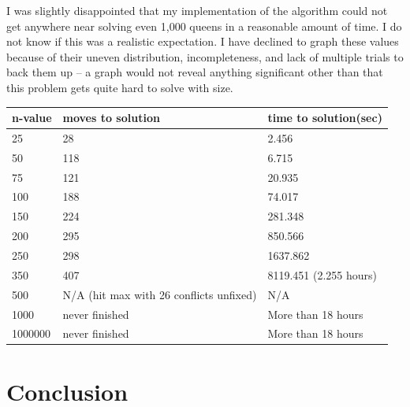 \documentclass{article}
\begin{document}
\begin{doublespace}
I was slightly disappointed that my implementation of the algorithm could not get anywhere near solving even 1,000 queens in a reasonable amount of time. I do not know if this was a realistic expectation. I have declined to graph these values because of their uneven distribution, incompleteness, and lack of multiple trials to back them up -- a graph would not reveal anything significant other than that this problem gets quite hard to solve with size.\\

\begin{center}
\begin{tabular}{|l | l | l|}
\hline
	n-value & moves to solution & time to solution(sec) \\ \hline
	25 & 28 & 2.456 \\ \hline
	50 & 118 & 6.715 \\ \hline
	75 & 121 & 20.935 \\ \hline
	100 & 188 & 74.017 \\ \hline
	150 & 224 & 281.348 \\ \hline
	200 & 295 & 850.566 \\ \hline
	250 & 298 & 1637.862 \\ \hline
	350 & 407 & 8119.451 (2.255 hours) \\ \hline
	500 & N/A (hit max with 26 conflicts unfixed) & N/A \\ \hline
	1000 & never finished & More than 18 hours \\ \hline
	1000000 & never finished & More than 18 hours \\
\hline
\end{tabular}
\end{center}

\section{Conclusion}




\end{doublespace}
\end{document}
